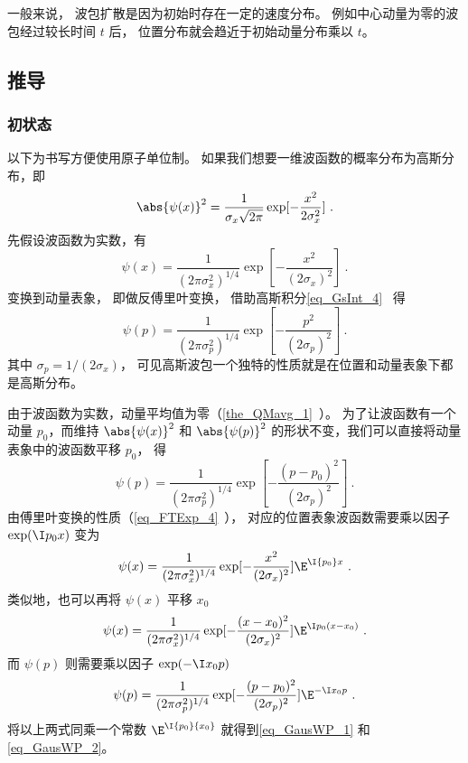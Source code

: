 一般来说， 波包扩散是因为初始时存在一定的速度分布。 例如中心动量为零的波包经过较长时间 $t$ 后， 位置分布就会趋近于初始动量分布乘以 $t$。

\subsection{推导}
\subsubsection{初状态}

以下为书写方便使用原子单位制。 如果我们想要一维波函数的概率分布为高斯分布，即
\begin{equation}
\abs{\psi (x)}^2 = \frac{1}{\sigma_x \sqrt{2\pi}} \exp[-\frac{x^2}{2\sigma_x^2}]~.
\end{equation}
先假设波函数为实数，有
\begin{equation}
\psi (x) = \frac{1}{(2\pi\sigma_x^2)^{1/4}} \exp[-\frac{x^2}{(2\sigma_x)^2}]~.
\end{equation}
变换到动量表象， 即做反傅里叶变换， 借助高斯积分\autoref{eq_GsInt_4}~ 得
\begin{equation}
\psi(p) = \frac{1}{(2\pi\sigma_p^2)^{1/4}} \exp[-\frac{p^2}{(2\sigma_p)^2}]~.
\end{equation}
其中 $\sigma_p = 1/(2\sigma_x)$， 可见高斯波包一个独特的性质就是在位置和动量表象下都是高斯分布。

由于波函数为实数，动量平均值为零（\autoref{the_QMavg_1}~）。 为了让波函数有一个动量 $p_0$，而维持 $\abs{\psi(x)}^2$ 和 $\abs{\psi(p)}^2$ %
的形状不变，我们可以直接将动量表象中的波函数平移 $p_0$， 得
\begin{equation}
\psi (p) = \frac{1}{(2\pi\sigma_p^2)^{1/4}} \exp[-\frac{(p - p_0)^2}{(2\sigma_p)^2}]~.
\end{equation}
由傅里叶变换的性质（\autoref{eq_FTExp_4}~）， 对应的位置表象波函数需要乘以因子 $\exp(\I p_0 x)$ 变为
\begin{equation}
\psi(x) = \frac{1}{(2\pi\sigma_x^2)^{1/4}} \exp[-\frac{x^2}{(2\sigma_x)^2}] {\E^{\I {p_0}x}}~.
\end{equation}
类似地，也可以再将 $\psi(x)$ 平移 $x_0$ 
\begin{equation}
\psi (x) = \frac{1}{(2\pi\sigma_x^2)^{1/4}} \exp[-\frac{(x-x_0)^2}{(2\sigma_x)^2}] \E^{\I p_0 (x-x_0)}~.
\end{equation}
而 $\psi(p)$ 则需要乘以因子 $\exp (-\I x_0 p)$
\begin{equation}\label{eq_GausWP_3}
\psi(p) = \frac{1}{(2\pi\sigma_p^2)^{1/4}} \exp[-\frac{(p - p_0)^2}{(2\sigma_p)^2}] \E^{-\I x_0 p}~.
\end{equation}
将以上两式同乘一个常数%
 ${\E^{\I{p_0}{x_0}}}$ 就得到\autoref{eq_GausWP_1} 和\autoref{eq_GausWP_2}。

